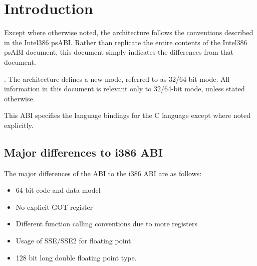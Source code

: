\chapter{Introduction}

Except where otherwise noted, the \xARCH architecture follows the
conventions described in the Intel386 psABI.  Rather than replicate
the entire contents of the Intel386 psABI document, this document
simply indicates the differences from that document.

.
The \xARCH architecture defines a new mode, referred to as 32/64-bit
mode. All information in this document is relevant only to 32/64-bit
mode, unless stated otherwise.

This ABI specifies the language bindings for the C language except
where noted explicitly.

\section{Major differences to i386 ABI}

The major differences of the \xARCH ABI to the i386 ABI are as
follows:
\begin{itemize}
\item 64 bit code and data model
\item No explicit GOT register
\item Different function calling conventions due to more registers
\item Usage of SSE/SSE2 for floating point
\item 128 bit long double floating point type. 
\end{itemize}

